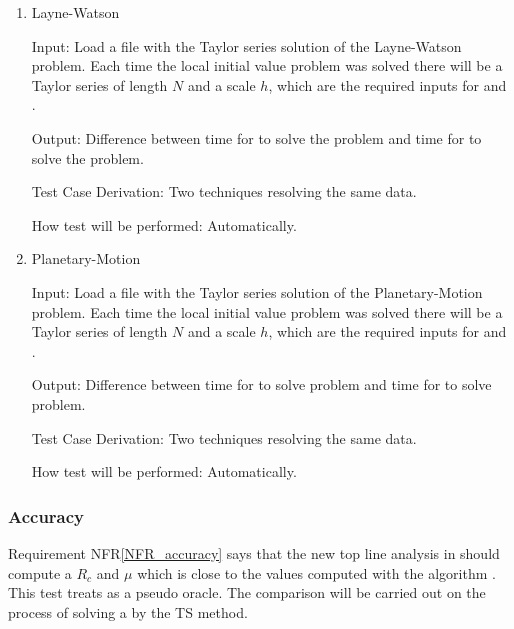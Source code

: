 \documentclass[12pt, titlepage]{article}
\newcommand{\nfrref}[1]{NFR\ref{#1}}
\begin{document}
\begin{enumerate}

  \item{Layne-Watson \citep{watson1979}\\}

					
					
Input: Load a file with the Taylor series solution of the Layne-Watson problem. Each time the
    local initial value problem was solved there will be a Taylor series of length $N$ and a scale $h$,
    which are the required inputs for  and \rdcon.
					
Output: Difference between time for  to solve the problem and time for \rdcon to
    solve the problem.

Test Case Derivation: Two techniques resolving the same data.
					
How test will be performed: Automatically.
					
\item{Planetary-Motion \citep{enright1987examples}\\}

					
					
Input: Load a file with the Taylor series solution of the Planetary-Motion problem. Each time the
    local initial value problem was solved there will be a Taylor series of length $N$ and a scale $h$,
    which are the required inputs for  and \rdcon.
					
Output: Difference between time for  to solve problem and time for \rdcon to solve problem.

Test Case Derivation: Two techniques resolving the same data.
					
How test will be performed: Automatically.

\end{enumerate}

\subsubsection{Accuracy}

Requirement \nfrref{NFR_accuracy} says that the new top line
analysis in  should compute a $R_c$ and $\mu$ which is
close to the values computed with the \cite{chang1982} algorithm \rdcon.
This test treats \rdcon as a pseudo oracle.
The comparison will be carried out on the process of solving a \dae \ivp by the TS method.
\end{document}

